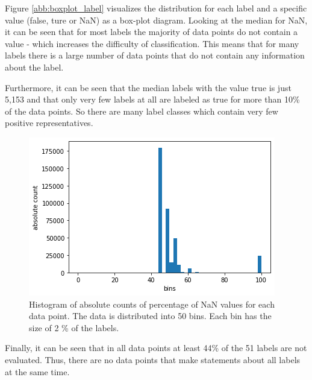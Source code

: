 Figure \ref{abb:boxplot_label} visualizes the distribution for each label and a specific value (false, ture or NaN) as a box-plot diagram. Looking at the median for NaN, it can be seen that for most labels the majority of data points do not contain a value - which increases the difficulty of classification. This means that for many labels there is a large number of data points that do not contain any information about the label.

Furthermore, it can be seen that the median labels with the value true is just 5,153 and that only very few labels at all are labeled as true for more than 10\% of the data points. So there are many label classes which contain very few positive representatives. 

\begin{figure}[H]
	\begin{center}
		\includegraphics[scale=.8]{images/hist.png}
		\caption{Histogram of absolute counts of percentage of NaN values for each data point. The data is distributed into 50 bins. Each bin has the size of 2 \% of the labels.}
		\label{abb:histogramm_data}
	\end{center}		
\end{figure}

Finally, it can be seen that in all data points at least 44\% of the 51 labels are not evaluated. Thus, there are no data points that make statements about all labels at the same time.